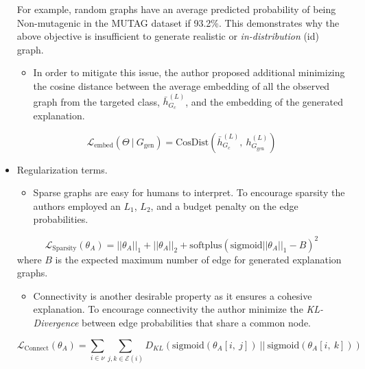 \documentclass[
  11pt,
  letterpaper,
]{article}
\providecommand{\tightlist}{%
  \setlength{\itemsep}{0pt}\setlength{\parskip}{0pt}}\usepackage{longtable,booktabs,array}
\begin{document}
\begin{itemize}
  For example, random graphs have an average predicted probability of
  being Non-mutagenic in the MUTAG dataset if 93.2\%. This demonstrates
  why the above objective is insufficient to generate realistic or
  \emph{in-distribution} (id) graph.

  \begin{itemize}
  \tightlist
  \item
    In order to mitigate this issue, the author proposed additional
    minimizing the cosine distance between the average embedding of all
    the observed graph from the targeted class, \(\bar h^{(L)}_{G_c}\),
    and the embedding of the generated explanation.
  \end{itemize}

  \begin{equation}
       \mathcal{L}_{\text{embed}}(\Theta \ | \ G_\text{gen}) = \text{CosDist}\left( \bar h^{(L)}_{G_c}, \ h^{(L)}_{G_\text{gen}} \right)
    \end{equation}
\item
  Regularization terms.

  \begin{itemize}
  \tightlist
  \item
    Sparse graphs are easy for humans to interpret. To encourage
    sparsity the authors employed an \(L_1\), \(L_2\), and a budget
    penalty on the edge probabilities.
  \end{itemize}

  \begin{equation}
        \mathcal{L}_{\text{Sparsity}}(\theta_A) = ||\theta_A||_1 + ||\theta_A||_2 + \text{softplus}(\text{sigmoid}||\theta_A||_1 - B)^2
    \end{equation} where \(B\) is the expected maximum number of edge
  for generated explanation graphs.

  \begin{itemize}
  \tightlist
  \item
    Connectivity is another desirable property as it ensures a cohesive
    explanation. To encourage connectivity the author minimize the
    \emph{KL-Divergence} between edge probabilities that share a common
    node.
  \end{itemize}

  \begin{equation}
        \mathcal{L}_{\text{Connect}}(\theta_A) = \sum_{i \in \nu} \sum_{j, k \in \mathcal{E}(i)} D_{KL}(\text{sigmoid}(\theta_A[i, \ j]) \ || \ \text{sigmoid}(\theta_A[i, \ k]))
    \end{equation}


\end{itemize}
\end{document}
